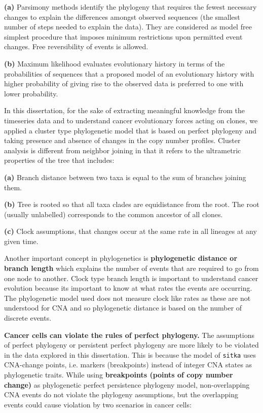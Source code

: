 \textbf{(a)} Parsimony methods identify the phylogeny that requires the fewest necessary changes to explain the differences amongst observed sequences (the smallest number of steps needed to explain the data). They are considered as model free simplest procedure that imposes minimum restrictions upon permitted event changes. Free reversibility of events is allowed.

\textbf{(b)} Maximum likelihood evaluates evolutionary history in terms of the probabilities of sequences that a proposed model of an evolutionary history with higher probability of giving rise to the observed data is preferred to one with lower probability. 


In this dissertation, for the sake of extracting meaningful knowledge from the timeseries data and to understand cancer evolutionary forces acting on clones, we applied a cluster type phylogenetic model that is based on perfect phylogeny and taking presence and absence of changes in the copy number profiles. 
Cluster analysis is different from neighbor joining in that it refers to the ultrametric properties of the tree that includes:

 \textbf{(a)} Branch distance between two taxa is equal to the sum of branches joining them.

\textbf{(b)} Tree is rooted so that all taxa clades are equidistance from the root. The root (usually unlabelled) corresponds to the common ancestor of all clones.

\textbf{(c)} Clock assumptions, that changes occur at the same rate in all lineages at any given time.

Another important concept in phylogenetics is \textbf{phylogenetic distance or branch length} which explains the number of events that are required to go from one node to another. Clock type branch length is important to understand cancer evolution because its important to know at what rates the events are occurring. The phylogenetic model used does not measure clock like rates as these are not understood for CNA and so phylogenetic distance is based on the number of discrete events.

\textbf{Cancer cells can violate the rules of perfect phylogeny.}
The assumptions of perfect phylogeny or persistent perfect phylogeny are more likely to be violated in the data explored in this dissertation. This is because the model of \texttt{sitka} \cite{dorri2020efficient} uses 
 CNA-change points, i.e. markers (breakpoints) instead of integer CNA states as phylogenetic traits. 
While using \textbf{breakpoints (points of copy number change)} as phylogenetic perfect persistence phylogeny model, non-overlapping CNA events do not violate the phylogeny assumptions, but the overlapping events could cause violation by two scenarios in cancer cells:

